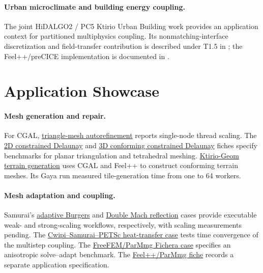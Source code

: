 \paragraph{Urban microclimate and building energy coupling.}
The joint HiDALGO2 / PC5 Ktirio Urban Building work provides an application
context for partitioned multiphysics coupling. Its nonmatching-interface
discretization and field-transfer contribution is described under T1.5 in
; the Feel++/preCICE implementation is documented
in .

\section{Application Showcase}
\label{sec:wp1:applications}

\paragraph{Mesh generation and repair.}
For CGAL, \hyperref[sec:app:specs:app-cgal-autorefine]{triangle-mesh
autorefinement} reports single-node thread scaling. The
\hyperref[sec:app:specs:app-cgal-cdt2]{2D constrained Delaunay} and
\hyperref[sec:app:specs:app-cgal-ccdt3]{3D conforming constrained Delaunay}
fiches specify benchmarks for planar triangulation and tetrahedral meshing.
\hyperref[sec:app:specs:app-feelpp-ktirio-geom]{Ktirio-Geom terrain
generation} uses CGAL and Feel++ to construct conforming terrain meshes.
Its Gaya run measured tile-generation time from one to 64 workers.

\paragraph{Mesh adaptation and coupling.}
Samurai's \hyperref[sec:app:specs:app-samurai-burgers-2d]{adaptive Burgers}
and \hyperref[sec:app:specs:app-samurai-euler-dmr]{Double Mach reflection}
cases provide executable weak- and strong-scaling workflows, respectively,
with scaling measurements pending. The
\hyperref[sec:app:specs:app-samurai-cwipi]{Cwipi--Samurai--PETSc heat-transfer
case} tests time convergence of the multistep coupling.
The \hyperref[sec:app:specs:app-freefem-parmmg]{FreeFEM/ParMmg Fichera
case} specifies an anisotropic solve--adapt benchmark.
The \hyperref[sec:app:specs:app-feelpp-parmmg]{Feel++/ParMmg fiche}
records a separate application specification.

